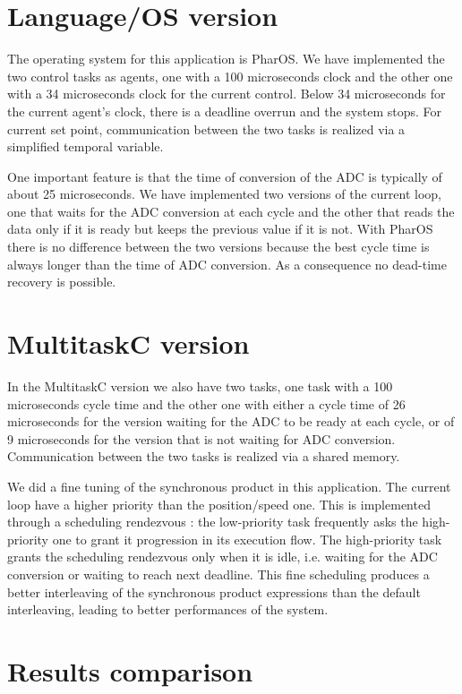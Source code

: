 \documentclass[10pt]{report}
\begin{document}
\section{Language/OS version}

The operating system for this application is PharOS. We have implemented the two control tasks as agents,
one with a 100 microseconds clock and the other one with a 34 microseconds clock for the current control. 
Below 34 microseconds for the current agent's clock, there is a deadline overrun and the system stops. 
For current set point, communication between the two tasks is realized via a simplified temporal variable.

One important feature is that the time of conversion of the ADC is typically of about 25 microseconds. We
have implemented two versions of the current loop, one that waits for the ADC conversion at each cycle
and the other that reads the data only if it is ready but keeps the previous value if it is not. With
PharOS there is no difference between the two versions because the best cycle time is always longer than
the time of ADC conversion. As a consequence no dead-time recovery is possible.

\section{MultitaskC version}

In the MultitaskC version we also have two tasks, one task with a 100 microseconds cycle time and the other one
with either a cycle time of 26 microseconds for the version waiting for the ADC to be ready at each cycle, or 
of 9 microseconds for the version that is not waiting for ADC conversion. Communication between the two
tasks is realized via a shared memory.

We did a fine tuning of the synchronous product in this application. The current loop have a higher priority
than the position/speed one. This is implemented through a scheduling rendezvous : the low-priority task frequently 
asks the high-priority one to grant it progression in its execution flow. The high-priority task grants the scheduling 
rendezvous only when it is idle, i.e. waiting for the ADC conversion or waiting to reach next deadline. 
This fine scheduling produces a better interleaving of the synchronous product expressions than the default interleaving, 
leading to better performances of the system.

\section{Results comparison}
\end{document}
